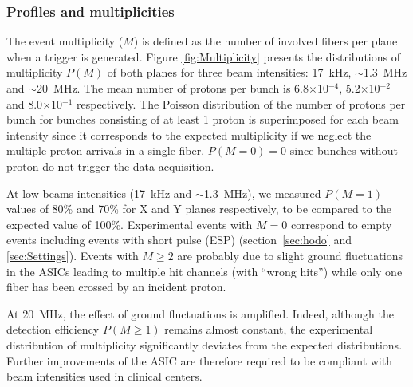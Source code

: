 \documentclass[a4paper,11pt]{article}
\begin{document}
\subsubsection{Profiles and multiplicities}
\label{Profiles_And_Multiplies}

The event multiplicity ($M$) is defined as the number of involved fibers per plane when a trigger is generated. Figure \ref{fig:Multiplicity} presents the distributions of multiplicity $P(M)$ of both planes for three beam intensities: 17~kHz, $\sim$1.3~MHz and $\sim$20~MHz. The mean number of protons per bunch is 6.8$\times$10$^{-4}$, 5.2$\times$10$^{-2}$ and 8.0$\times$10$^{-1}$ respectively. The Poisson distribution of the number of protons per bunch for bunches consisting of at least 1 proton is superimposed for each beam intensity since it corresponds to the expected multiplicity if we neglect the multiple proton arrivals in a single fiber. $P(M = 0)=0$ since bunches without proton do not trigger the data acquisition. 

At low beams intensities (17~kHz and $\sim$1.3~MHz), we measured $P(M=1)$ values of 80\% and 70\% for X and Y planes respectively, to be compared to the expected value of 100\%. Experimental events with $M=0$ correspond to empty events including events with short pulse (ESP) (section~\ref{sec:hodo} and \ref{sec:Settings}). Events with $M\ge2$ are probably due to slight ground fluctuations in the ASICs leading to multiple hit channels (with \enquote{wrong hits}) while only one fiber has been crossed by an incident proton. 

At 20~MHz, the effect of ground fluctuations is amplified. Indeed, although the detection efficiency $P(M\ge1)$ remains almost constant, the experimental distribution of multiplicity significantly deviates from the expected distributions. Further improvements of the ASIC are therefore required to be compliant with beam intensities used in clinical centers.
\end{document}
